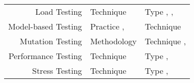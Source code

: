 \begin{paperTable}
\begin{minipage}{\linewidth}
\begin{tabular}{|r|l|l|}
            Load Testing             & Technique \cite[p.~38]{IEEE2021}                                   & Type \cite[pp.~5,~20,~22]{IEEE2022}, \cite{ISTQB}, \cite[p.~253]{IEEE2017}                                                              \\
            Model-based Testing      & Practice \cite[p.~22]{IEEE2022}, \cite[p.~viii]{IEEE2021}          & Technique \cite[p.~4]{Kam2008}                                                                                                          \\
            Mutation Testing         & Methodology \cite[p.~286]{IEEE2017}                                & Technique \cite[p.~5-15]{SWEBOK2024}, \cite[pp.~428--429]{vanVliet2000}                                                                 \\
            Performance Testing      & Technique \cite[p.~38]{IEEE2021}                                   & Type \cite[pp.~7,~22,~26--27]{IEEE2022}, \cite[p.~7]{IEEE2021}                                                                          \\
            Stress Testing           & Technique \cite[p.~38]{IEEE2021}                                   & Type \cite[pp.~9,~22]{IEEE2022}, \cite[p.~442]{IEEE2017}                                                                                \\
            \hline
        \end{tabular}
    \end{minipage}
\end{paperTable}
